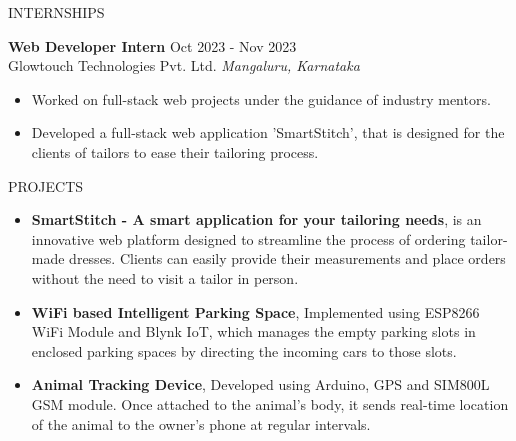 \documentclass{resume} %
\begin{document}
\begin{rSection}{INTERNSHIPS}

\textbf{Web Developer Intern} \hfill Oct 2023 - Nov 2023\\
Glowtouch Technologies Pvt. Ltd. \hfill \textit{Mangaluru, Karnataka}
 \begin{itemize}
    \itemsep -3pt {} 
     \item Worked on full-stack web projects under the guidance of industry mentors.
    \item Developed a full-stack web application 'SmartStitch', that is designed for the clients of tailors to ease their tailoring process. 
 \end{itemize}
 


\end{rSection} 


\begin{rSection}{PROJECTS}
\begin{itemize}
\item \textbf{SmartStitch - A smart application for your tailoring needs}{, is an innovative web platform designed to streamline the process of ordering tailor-made dresses. Clients can easily provide their measurements and place orders without the need to visit a tailor in person.}
\item \textbf{WiFi based Intelligent Parking Space}{, Implemented using ESP8266 WiFi Module and Blynk IoT, which manages the empty parking slots in enclosed parking spaces by directing the incoming cars to those slots.}
\item \textbf{Animal Tracking Device}{, Developed using Arduino, GPS and SIM800L GSM module. Once attached to the animal's body, it sends real-time location of the animal to the owner's phone at regular intervals.}
\end{itemize}

\end{rSection} 
\end{document}
